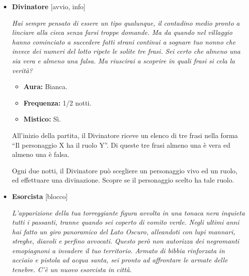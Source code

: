 \documentclass[a4paper,10pt]{article}
\begin{document}
\begin{itemize}
            \begin{multicols}{3}
                  \begin{itemize}
                        \item \textbf{Aura:} Bianca.
                        \item \textbf{Frequenza:} n/a.
                        \item \textbf{Mistico:} No.
                  \end{itemize}
            \end{multicols}

            Il Contadino non ha alcuna abilità.

      \item \textbf{Divinatore} [avvio, info]

            \emph{Hai sempre pensato di essere un tipo qualunque, il contadino medio pronto a linciare alla cieca senza farsi troppe domande. Ma da quando nel villaggio hanno cominciato a succedere fatti strani continui a sognare tuo nonno che invece dei numeri del lotto ripete le solite tre frasi. Sei certo che almeno una sia vera e almeno una falsa. Ma riuscirai a scoprire in quali frasi si cela la verità?}

            \begin{multicols}{3}
                  \begin{itemize}
                        \item \textbf{Aura:} Bianca.
                        \item \textbf{Frequenza:} 1/2 notti.
                        \item \textbf{Mistico:} Sì.
                  \end{itemize}
            \end{multicols}

            All'inizio della partita, il Divinatore riceve un elenco di tre frasi nella forma ``Il personaggio X ha il ruolo Y''. Di queste tre frasi almeno una è vera ed almeno una è falsa.

            Ogni due notti, il Divinatore può scegliere un personaggio vivo ed un ruolo, ed effettuare una divinazione. Scopre se il personaggio scelto ha tale ruolo.

      \item \textbf{Esorcista} [blocco]

            \emph{L'apparizione della tua torreggiante figura avvolta in una tonaca nera inquieta tutti i passanti, tranne quando sei coperto di vomito verde. Negli ultimi anni hai fatto un giro panoramico del Lato Oscuro, alleandoti con lupi mannari, streghe, diavoli e perfino avvocati. Questo però non autorizza dei negromanti emopiagnoni a invadere il tuo territorio. Armato di bibbia rinforzata in acciaio e pistola ad acqua santa, sei pronto ad affrontare le armate delle tenebre. C'è un nuovo esorcista in città.}


\end{itemize}
\end{document}
